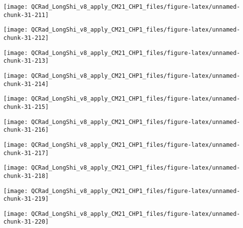 \documentclass[
  10pt,
  a4paper,oneside]{article}
\begin{document}
\begin{center}\texttt{[image: QCRad\_LongShi\_v8\_apply\_CM21\_CHP1\_files/figure-latex/unnamed-chunk-31-211]} \end{center}

\begin{center}\texttt{[image: QCRad\_LongShi\_v8\_apply\_CM21\_CHP1\_files/figure-latex/unnamed-chunk-31-212]} \end{center}

\begin{center}\texttt{[image: QCRad\_LongShi\_v8\_apply\_CM21\_CHP1\_files/figure-latex/unnamed-chunk-31-213]} \end{center}

\begin{center}\texttt{[image: QCRad\_LongShi\_v8\_apply\_CM21\_CHP1\_files/figure-latex/unnamed-chunk-31-214]} \end{center}

\begin{center}\texttt{[image: QCRad\_LongShi\_v8\_apply\_CM21\_CHP1\_files/figure-latex/unnamed-chunk-31-215]} \end{center}

\begin{center}\texttt{[image: QCRad\_LongShi\_v8\_apply\_CM21\_CHP1\_files/figure-latex/unnamed-chunk-31-216]} \end{center}

\begin{center}\texttt{[image: QCRad\_LongShi\_v8\_apply\_CM21\_CHP1\_files/figure-latex/unnamed-chunk-31-217]} \end{center}

\begin{center}\texttt{[image: QCRad\_LongShi\_v8\_apply\_CM21\_CHP1\_files/figure-latex/unnamed-chunk-31-218]} \end{center}

\begin{center}\texttt{[image: QCRad\_LongShi\_v8\_apply\_CM21\_CHP1\_files/figure-latex/unnamed-chunk-31-219]} \end{center}

\begin{center}\texttt{[image: QCRad\_LongShi\_v8\_apply\_CM21\_CHP1\_files/figure-latex/unnamed-chunk-31-220]} \end{center}
\end{document}
